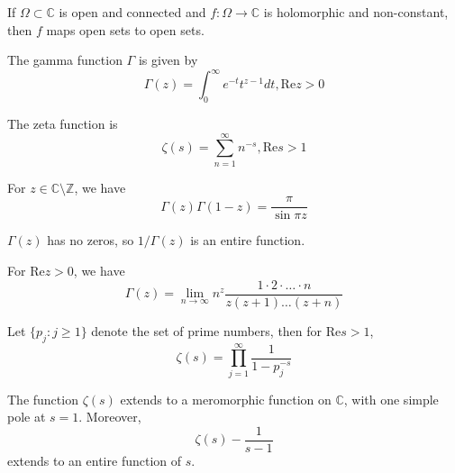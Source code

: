 \documentclass[openany]{book}
\newcommand{\Z}{\mathbb{Z}}
\newcommand{\C}{\mathbb{C}}
\begin{document}
\begin{prop}
    If $\Omega\subset\C$ is open and connected and $f:\Omega\to\C$ is holomorphic and non-constant, then $f$ maps open sets to open sets.
\end{prop}


\begin{defn}
    The gamma function $\Gamma$ is given by 
    \begin{equation*}
        \Gamma(z)=\int_0^\infty e^{-t}t^{z-1}dt, \text{Re}z>0
    \end{equation*}
\end{defn}

\begin{defn}
    The zeta function is 
    \begin{equation*}
        \zeta(s)=\sum_{n=1}^\infty n^{-s}, \text{Re}s>1
    \end{equation*}
\end{defn}


\begin{prop}
    For $z\in\C\setminus\Z$, we have 
    \begin{equation*}
        \Gamma(z)\Gamma(1-z)=\frac{\pi}{\sin\pi z}
    \end{equation*}
\end{prop}
\begin{prop}
    $\Gamma(z)$ has no zeros, so $1/\Gamma(z)$ is an entire function.
\end{prop}

\begin{prop}
    For $\text{Re}z>0$, we have 
    \begin{equation*}
        \Gamma(z)=\lim_{n\to\infty}n^z\frac{1\cdot 2\cdot\dots \cdot n}{z(z+1)\dots(z+n)}
    \end{equation*}
\end{prop}


\begin{prop}
    Let $\{p_j:j\geq 1\}$ denote the set of prime numbers, then for $\text{Re}s>1$, 
    \begin{equation*}
        \zeta(s)=\prod_{j=1}^\infty\frac{1}{1-p_j^{-s}}
    \end{equation*}
\end{prop}

\begin{prop}
    The function $\zeta(s)$ extends to a meromorphic function on $\C$, with one simple pole at $s=1$. Moreover, 
    \begin{equation*}
        \zeta(s)-\frac{1}{s-1}
    \end{equation*}
    extends to an entire function of $s$.
\end{prop}
\end{document}
